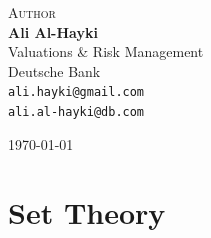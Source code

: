\documentclass[12pt]{article}
\begin{document}
\begin{titlepage}
	
	\vfill\vfill\vfill
		\large
	\textsc{Author}\\
	\small {\textbf{Ali Al-Hayki}\\
		Valuations \& Risk Management\\
		Deutsche Bank\\
		\texttt{ali.hayki@gmail.com} \\
		\texttt{ali.al-hayki@db.com} \\}
	
	
	
	
	\vfill\vfill\vfill %
	
	{\large\today} %
	
	
	
	
	\vfill %
	
\end{titlepage}


\tableofcontents
\newpage
\listoffigures
\newpage
\listoftables
\newpage



\begin{abstract}
	\lipsum[1]
\end{abstract}

\setlength{\parindent}{0em}
\setlength{\parskip}{0.5em}
\renewcommand{\baselinestretch}{0.01}
\newcommand{\R}{\mathbb{R}}
\newcommand{\B}{\mathbb{B}}
\newcommand{\C}{\mathbb{C}}
\section{Set Theory}
\end{document}
